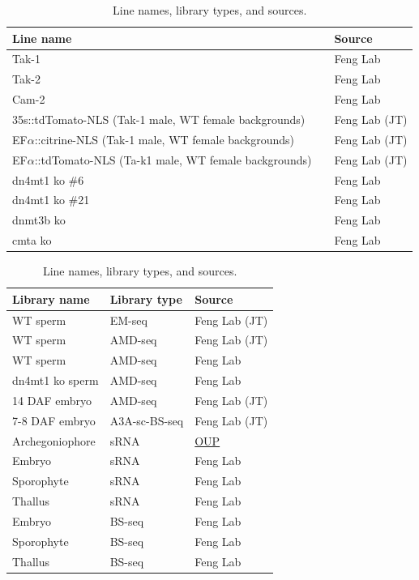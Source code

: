 \begin{table}[htbp]
\centering
\begin{tabular}{|p{6cm}|p{3cm}|p{4cm}|} %
\hline
\textbf{Line name} &  & \textbf{Source} \\
\hline
Tak-1 & & Feng Lab \\
Tak-2 & & Feng Lab \\
Cam-2 & & Feng Lab \\
35s::tdTomato-NLS (Tak-1 male, WT female backgrounds) & & Feng Lab (JT) \\
EF$\alpha$::citrine-NLS (Tak-1 male, WT female backgrounds) & & Feng Lab (JT) \\
EF$\alpha$::tdTomato-NLS (Ta-k1 male, WT female backgrounds) & & Feng Lab (JT) \\
dn4mt1 ko \#6 & & Feng Lab \citep{RN189} \\
dn4mt1 ko \#21 & & Feng Lab \citep{RN189} \\
dnmt3b ko & & Feng Lab \citep{RN189} \\
cmta ko & & Feng Lab \citep{RN189} \\
\hline
\end{tabular}
\begin{tabular}{|p{6cm}|p{3cm}|p{4cm}|} %
\hline
\textbf{Library name} & \textbf{Library type} & \textbf{Source} \\
\hline
WT sperm & EM-seq & Feng Lab (JT) \\
WT sperm & AMD-seq & Feng Lab (JT) \\
WT sperm & AMD-seq & Feng Lab \\
dn4mt1 ko sperm & AMD-seq & Feng Lab \\
14 DAF embryo & AMD-seq & Feng Lab (JT) \\
7-8 DAF embryo & A3A-sc-BS-seq & Feng Lab (JT) \\
\hline
Archegoniophore & sRNA & \href{https://academic.oup.com/pcp/article/57/2/359/2460930}{OUP} \\
Embryo & sRNA & Feng Lab \\
Sporophyte & sRNA & Feng Lab \\
Thallus & sRNA & Feng Lab \\
\hline
Embryo & BS-seq & Feng Lab \\
Sporophyte & BS-seq & Feng Lab \\
Thallus & BS-seq & Feng Lab \\
\hline
\end{tabular}
\caption{Line names, library types, and sources.}
\end{table}


